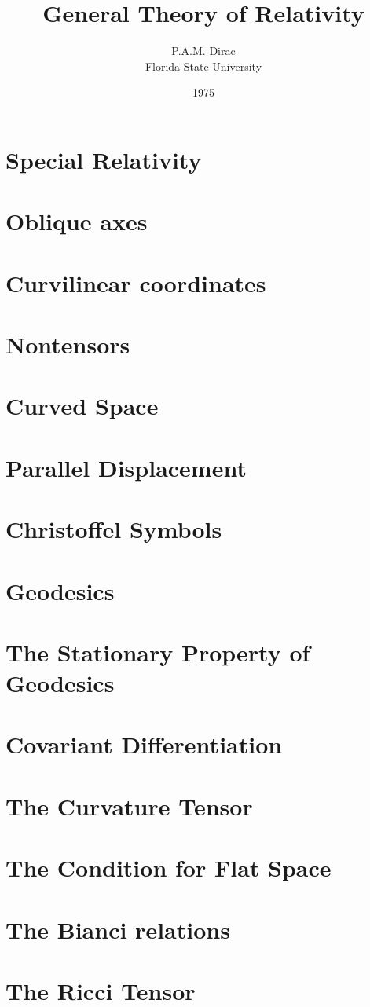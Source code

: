 \documentclass[10pt]{book}
\title{General Theory of Relativity}
\author{P.A.M. Dirac\\Florida State University}
\date{1975}
\begin{document}
\maketitle
\chapter{Special Relativity}

\chapter{Oblique axes}

\chapter{Curvilinear coordinates}

\chapter{Nontensors}

\chapter{Curved Space}

\chapter{Parallel Displacement}

\chapter{Christoffel Symbols}

\chapter{Geodesics}

\chapter{The Stationary Property of Geodesics}

\chapter{Covariant Differentiation}

\chapter{The Curvature Tensor}

\chapter{The Condition for Flat Space}

\chapter{The Bianci relations}

\chapter{The Ricci Tensor}

\end{document}
